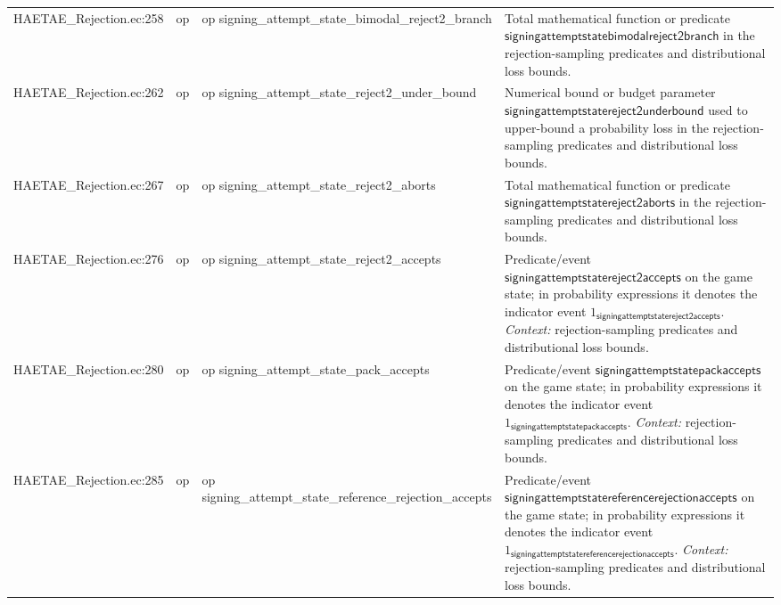 \documentclass[10pt]{article}
\begin{document}
\begin{longtable}{L{0.11\textwidth}L{0.055\textwidth}L{0.385\textwidth}L{0.41\textwidth}}
HAETAE\_\allowbreak{}Rejection.\allowbreak{}ec:\allowbreak{}258 & op & {\ttfamily\scriptsize op signing\_\allowbreak{}attempt\_\allowbreak{}state\_\allowbreak{}bimodal\_\allowbreak{}reject2\_\allowbreak{}branch} & Total mathematical function or predicate $\mathsf{signingattemptstatebimodalreject2branch}$ in the rejection-sampling predicates and distributional loss bounds. \\
HAETAE\_\allowbreak{}Rejection.\allowbreak{}ec:\allowbreak{}262 & op & {\ttfamily\scriptsize op signing\_\allowbreak{}attempt\_\allowbreak{}state\_\allowbreak{}reject2\_\allowbreak{}under\_\allowbreak{}bound} & Numerical bound or budget parameter $\mathsf{signingattemptstatereject2underbound}$ used to upper-bound a probability loss in the rejection-sampling predicates and distributional loss bounds. \\
HAETAE\_\allowbreak{}Rejection.\allowbreak{}ec:\allowbreak{}267 & op & {\ttfamily\scriptsize op signing\_\allowbreak{}attempt\_\allowbreak{}state\_\allowbreak{}reject2\_\allowbreak{}aborts} & Total mathematical function or predicate $\mathsf{signingattemptstatereject2aborts}$ in the rejection-sampling predicates and distributional loss bounds. \\
HAETAE\_\allowbreak{}Rejection.\allowbreak{}ec:\allowbreak{}276 & op & {\ttfamily\scriptsize op signing\_\allowbreak{}attempt\_\allowbreak{}state\_\allowbreak{}reject2\_\allowbreak{}accepts} & Predicate/event $\mathsf{signingattemptstatereject2accepts}$ on the game state; in probability expressions it denotes the indicator event $1_{\mathsf{signingattemptstatereject2accepts}}$. \emph{Context:} rejection-sampling predicates and distributional loss bounds. \\
HAETAE\_\allowbreak{}Rejection.\allowbreak{}ec:\allowbreak{}280 & op & {\ttfamily\scriptsize op signing\_\allowbreak{}attempt\_\allowbreak{}state\_\allowbreak{}pack\_\allowbreak{}accepts} & Predicate/event $\mathsf{signingattemptstatepackaccepts}$ on the game state; in probability expressions it denotes the indicator event $1_{\mathsf{signingattemptstatepackaccepts}}$. \emph{Context:} rejection-sampling predicates and distributional loss bounds. \\
HAETAE\_\allowbreak{}Rejection.\allowbreak{}ec:\allowbreak{}285 & op & {\ttfamily\scriptsize op signing\_\allowbreak{}attempt\_\allowbreak{}state\_\allowbreak{}reference\_\allowbreak{}rejection\_\allowbreak{}accepts} & Predicate/event $\mathsf{signingattemptstatereferencerejectionaccepts}$ on the game state; in probability expressions it denotes the indicator event $1_{\mathsf{signingattemptstatereferencerejectionaccepts}}$. \emph{Context:} rejection-sampling predicates and distributional loss bounds. \\

\end{longtable}
\end{document}
